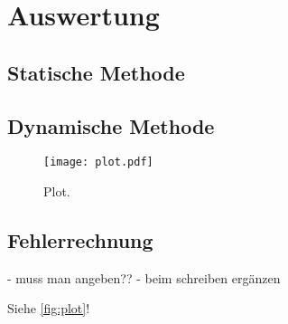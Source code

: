 \section{Auswertung}
\label{sec:Auswertung}

\subsection{Statische Methode}
\label{Statische Methode}






\subsection{Dynamische Methode}
\label{Dynamische Methode}




\begin{figure}
  \centering
  \texttt{[image: plot.pdf]}
  \caption{Plot.}
  \label{fig:plot}
\end{figure}

\subsection{Fehlerrechnung}
\label{Fehlerrechnung}

- muss man angeben??
- beim schreiben ergänzen


Siehe \autoref{fig:plot}!
